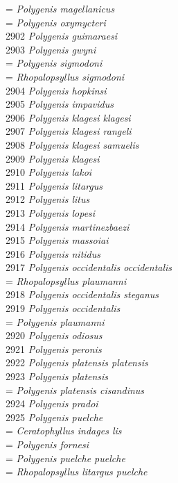 \documentclass[
]{article}
\begin{document}
= \emph{Polygenis magellanicus}\\
= \emph{Polygenis oxymycteri}\\
2902 \emph{Polygenis guimaraesi}\\
2903 \emph{Polygenis gwyni}\\
= \emph{Polygenis sigmodoni}\\
= \emph{Rhopalopsyllus sigmodoni}\\
2904 \emph{Polygenis hopkinsi}\\
2905 \emph{Polygenis impavidus}\\
2906 \emph{Polygenis klagesi klagesi}\\
2907 \emph{Polygenis klagesi rangeli}\\
2908 \emph{Polygenis klagesi samuelis}\\
2909 \emph{Polygenis klagesi}\\
2910 \emph{Polygenis lakoi}\\
2911 \emph{Polygenis litargus}\\
2912 \emph{Polygenis litus}\\
2913 \emph{Polygenis lopesi}\\
2914 \emph{Polygenis martinezbaezi}\\
2915 \emph{Polygenis massoiai}\\
2916 \emph{Polygenis nitidus}\\
2917 \emph{Polygenis occidentalis occidentalis}\\
= \emph{Rhopalopsyllus plaumanni}\\
2918 \emph{Polygenis occidentalis steganus}\\
2919 \emph{Polygenis occidentalis}\\
= \emph{Polygenis plaumanni}\\
2920 \emph{Polygenis odiosus}\\
2921 \emph{Polygenis peronis}\\
2922 \emph{Polygenis platensis platensis}\\
2923 \emph{Polygenis platensis}\\
= \emph{Polygenis platensis cisandinus}\\
2924 \emph{Polygenis pradoi}\\
2925 \emph{Polygenis puelche}\\
= \emph{Ceratophyllus indages lis}\\
= \emph{Polygenis fornesi}\\
= \emph{Polygenis puelche puelche}\\
= \emph{Rhopalopsyllus litargus puelche}\\
\end{document}
